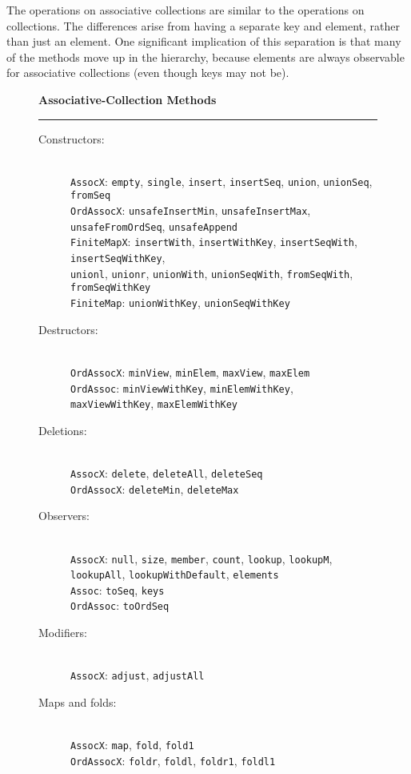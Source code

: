 \documentclass{report}
\newcommand{\cd}{\texttt}
\newcommand{\nl}{\hspace*{0pt}\\}
\begin{document}
The operations on associative collections are similar to the operations
on collections.  The differences arise from having a separate key and
element, rather than just an element.  One significant implication
of this separation is that many of the methods move up in the
hierarchy, because elements are always observable for associative
collections (even though keys may not be).

\begin{figure}
\begin{center}
\large\bfseries Associative-Collection Methods
\end{center}
\hrule
\begin{description}
\item[Constructors:] \nl
\cd{AssocX}: \cd{empty}, \cd{single}, \cd{insert}, \cd{insertSeq}, \cd{union}, \cd{unionSeq}, \cd{fromSeq} \\
\cd{OrdAssocX}: \cd{unsafeInsertMin}, \cd{unsafeInsertMax}, \cd{unsafeFromOrdSeq}, \cd{unsafeAppend} \\
\cd{FiniteMapX}: \cd{insertWith}, \cd{insertWithKey}, \cd{insertSeqWith}, \cd{insertSeqWithKey}, \\
  \hspace*{20pt}
  \cd{unionl}, \cd{unionr}, \cd{unionWith}, \cd{unionSeqWith}, \cd{fromSeqWith}, \cd{fromSeqWithKey} \\
\cd{FiniteMap}: \cd{unionWithKey}, \cd{unionSeqWithKey}
\item[Destructors:] \nl
\cd{OrdAssocX}: \cd{minView}, \cd{minElem}, \cd{maxView}, \cd{maxElem} \\
\cd{OrdAssoc}: \cd{minViewWithKey}, \cd{minElemWithKey}, \cd{maxViewWithKey}, \cd{maxElemWithKey}
\item[Deletions:] \nl
\cd{AssocX}: \cd{delete}, \cd{deleteAll}, \cd{deleteSeq} \\
\cd{OrdAssocX}: \cd{deleteMin}, \cd{deleteMax}
\item[Observers:] \nl
\cd{AssocX}: \cd{null}, \cd{size}, \cd{member}, \cd{count}, \cd{lookup}, \cd{lookupM}, \cd{lookupAll}, \cd{lookupWithDefault}, \cd{elements} \\
\cd{Assoc}: \cd{toSeq}, \cd{keys} \\
\cd{OrdAssoc}: \cd{toOrdSeq}
\item[Modifiers:] \nl
\cd{AssocX}: \cd{adjust}, \cd{adjustAll}
\item[Maps and folds:] \nl
\cd{AssocX}: \cd{map}, \cd{fold}, \cd{fold1} \\
\cd{OrdAssocX}: \cd{foldr}, \cd{foldl}, \cd{foldr1}, \cd{foldl1} \\

\end{description}
\end{figure}
\end{document}
